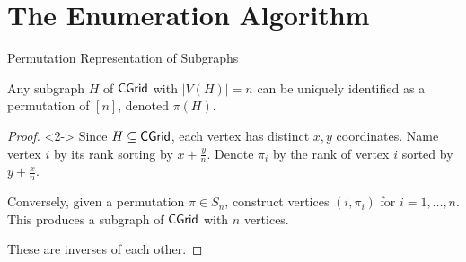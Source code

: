 \section{The Enumeration Algorithm}

\begin{frame}{Permutation Representation of Subgraphs}

\begin{lemma}
Any subgraph $H$ of $\textsf{CGrid}$ with $|V(H)| = n$ can be uniquely identified as a permutation of $[n]$, denoted $\pi(H)$.
\end{lemma}

\begin{proof}<2->
Since $H \subseteq \textsf{CGrid}$, each vertex has distinct $x,y$ coordinates. Name vertex $i$ by its rank sorting by $x + \frac{y}{n}$. Denote $\pi_i$ by the rank of vertex $i$ sorted by $y + \frac{x}{n}$. 

\vspace{0.5cm}

Conversely, given a permutation $\pi \in S_n$, construct vertices $(i, \pi_i)$ for $i=1,\dots,n$. This produces a subgraph of $\textsf{CGrid}$ with $n$ vertices.

\vspace{0.5cm}

These are inverses of each other.
\end{proof}

\end{frame}


